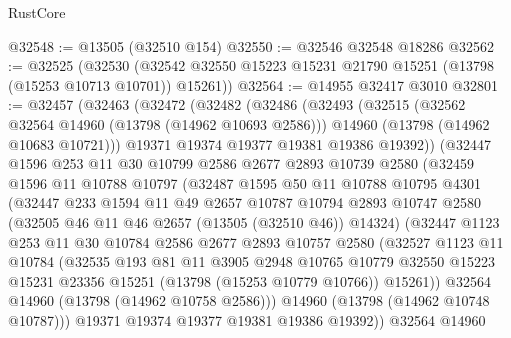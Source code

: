 \begin{lexlean}{RustCore}
\begin{coremodule}
@32548 := @13505 (@32510 @154)
@32550 := @32546 @32548 @18286
@32562 := @32525
    (@32530 (@32542 @32550 @15223 @15231 @21790 @15251 (@13798 (@15253 @10713 @10701)) @15261))
@32564 := @14955 @32417 @3010
@32801 := @32457
    (@32463
      (@32472
        (@32482
          (@32486
            (@32493
              (@32515
                (@32562 @32564 @14960 (@13798 (@14962 @10693 @2586)))
                @14960
                (@13798 (@14962 @10683 @10721)))
              @19371
              @19374
              @19377
              @19381
              @19386
              @19392))
          (@32447
            @1596
            @253
            @11
            @30
            @10799
            @2586
            @2677
            @2893
            @10739
            @2580
            (@32459
              @1596
              @11
              @10788
              @10797
              (@32487
                @1595
                @50
                @11
                @10788
                @10795
                @4301
                (@32447
                  @233
                  @1594
                  @11
                  @49
                  @2657
                  @10787
                  @10794
                  @2893
                  @10747
                  @2580
                  (@32505 @46 @11 @46 @2657 (@13505 (@32510 @46)) @14324)
                  (@32447
                    @1123
                    @253
                    @11
                    @30
                    @10784
                    @2586
                    @2677
                    @2893
                    @10757
                    @2580
                    (@32527
                      @1123
                      @11
                      @10784
                      (@32535
                        @193
                        @81
                        @11
                        @3905
                        @2948
                        @10765
                        @10779
                        @32550
                        @15223
                        @15231
                        @23356
                        @15251
                        (@13798 (@15253 @10779 @10766))
                        @15261))
                    @32564
                    @14960
                    (@13798 (@14962 @10758 @2586)))
                  @14960
                  (@13798 (@14962 @10748 @10787)))
                @19371
                @19374
                @19377
                @19381
                @19386
                @19392))
            @32564
            @14960

\end{coremodule}
\end{lexlean}
